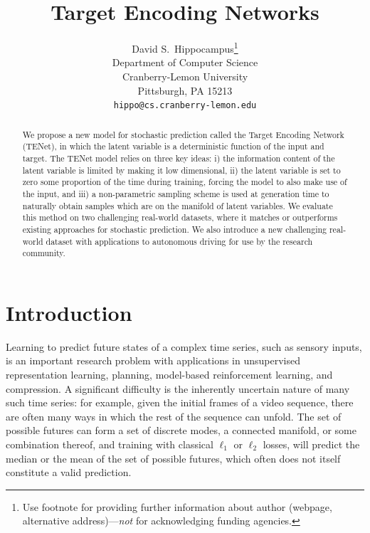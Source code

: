\documentclass{article}
\title{Target Encoding Networks}
\author{
  David S.~Hippocampus\thanks{Use footnote for providing further
    information about author (webpage, alternative
    address)---\emph{not} for acknowledging funding agencies.} \\
  Department of Computer Science\\
  Cranberry-Lemon University\\
  Pittsburgh, PA 15213 \\
  \texttt{hippo@cs.cranberry-lemon.edu} \\
}
\begin{document}

\maketitle

\begin{abstract}
  We propose a new model for stochastic prediction called the Target Encoding Network (TENet), in which the latent variable is a deterministic function of the input and target. The TENet model relies on three key ideas: i) the information content of the latent variable is limited by making it low dimensional, ii) the latent variable is set to zero some proportion of the time during training, forcing the model to also make use of the input, and iii) a non-parametric sampling scheme is used at generation time to naturally obtain samples which are on the manifold of latent variables. We evaluate this method on two challenging real-world datasets, where it matches or outperforms existing approaches for stochastic prediction. We also introduce a new challenging real-world dataset with applications to autonomous driving for use by the research community.
\end{abstract}


\section{Introduction}

Learning to predict future states of a complex time series, such as sensory inputs, is an important research problem with applications in unsupervised representation learning, planning, model-based reinforcement learning, and compression.
A significant difficulty is the inherently uncertain nature of many such time series: for example, given the initial frames of a video sequence, there are often many ways in which the rest of the sequence can unfold.
The set of possible futures can form a set of discrete modes, a connected manifold, or some combination thereof, and training with classical $\ell_1$ or $\ell_2$ losses, will predict the median or the mean of the set of possible futures, which often does not itself constitute a valid prediction.
\end{document}
